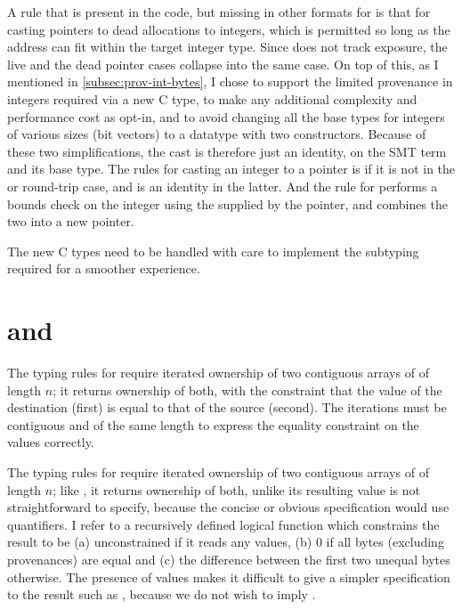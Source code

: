 A rule that is present in the code, but missing in other formats for
 is that for casting pointers to dead allocations to integers,
which is permitted so long as the address can fit within the target integer
type. Since  does not track exposure, the live and the dead
pointer cases collapse into the same case. On top of this, as I mentioned in
\cref{subsec:prov-int-bytes}, I chose to support the limited provenance in
integers required via a new C type, to make any additional complexity and
performance cost as opt-in, and to avoid changing all the base types for
integers of various sizes (bit vectors) to a datatype with two constructors.
Because of these two simplifications, the cast is therefore just an identity,
on the SMT term and its base type. The rules for
casting an integer to a pointer is  if it is not in the 
or round-trip case, and is an identity in the latter. And the rule for  performs a bounds check on
the integer using the  supplied by the pointer, and combines the
two into a new pointer.

The new C types need to be handled with care to implement the subtyping
required for a smoother experience.

\section{ and }

The typing rules for  require iterated ownership of two
contiguous arrays of  of length $n$; it returns ownership of
both, with the constraint that the value of the destination (first) is equal to
that of the source (second). The iterations must be contiguous and of the same
length to express the equality constraint on the values correctly.

The typing rules for  require iterated ownership of two
contiguous arrays of  of length $n$; like , it
returns ownership of both, unlike  its resulting value is not
straightforward to specify, because the concise or obvious specification would
use quantifiers. I refer to a recursively defined logical function which
constrains the result to be (a) unconstrained if it reads any
 values, (b) 0 if all bytes (excluding provenances) are equal
and (c) the difference between the first two unequal bytes otherwise. The presence
of  values makes it difficult to give a simpler specification
to the result such as , because we do not wish to imply %
.


